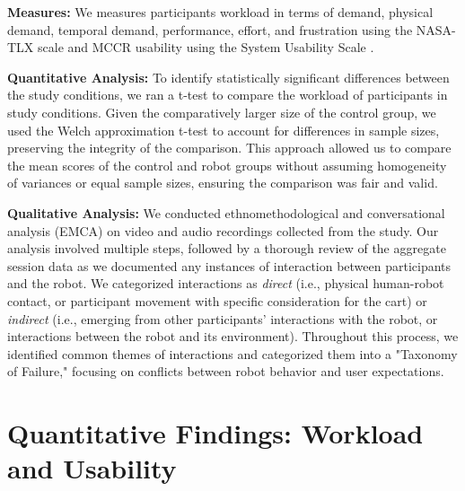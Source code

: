 \textbf{Measures:} We measures participants workload in terms of demand, physical demand, temporal demand, performance, effort, and frustration using the NASA-TLX scale \cite{hart2006nasa} and MCCR usability using the System Usability Scale \cite{brooke1996sus}.


\textbf{Quantitative Analysis:} To identify statistically significant differences between the study conditions, we ran a t-test to compare the workload of participants in study conditions. Given the comparatively larger size of the control group, we used the Welch approximation t-test to account for differences in sample sizes, preserving the integrity of the comparison. This approach allowed us to compare the mean scores of the control and robot groups without assuming homogeneity of variances or equal sample sizes, ensuring the comparison was fair and valid.

\textbf{Qualitative Analysis:} We conducted ethnomethodological and conversational analysis (EMCA) on video and audio recordings collected from the study. Our analysis involved multiple steps, followed by a thorough review of the aggregate session data as we documented any instances of interaction between participants and the robot. We categorized interactions as \textit{direct} (i.e., physical human-robot contact, or participant movement with specific consideration for the cart) or \textit{indirect} (i.e., emerging from other participants' interactions with the robot, or interactions between the robot and its environment). Throughout this process, we identified common themes of interactions and categorized them into a "Taxonomy of Failure," focusing on conflicts between robot behavior and user expectations.%




\section{Quantitative Findings: Workload and Usability}
 \label{sec:quan_results}

